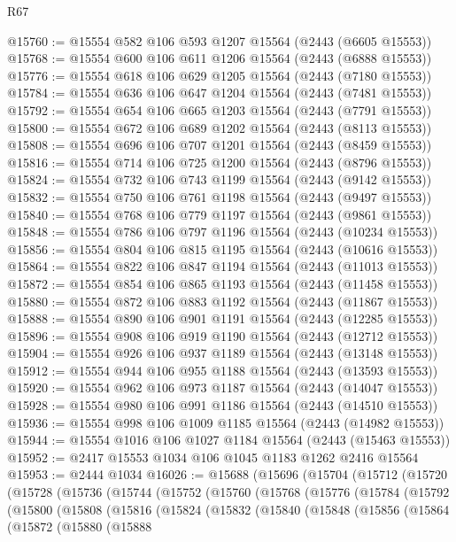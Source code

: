 \begin{lexlean}{R67}
\begin{coremodule}
@15760 := @15554 @582 @106 @593 @1207 @15564 (@2443 (@6605 @15553))
@15768 := @15554 @600 @106 @611 @1206 @15564 (@2443 (@6888 @15553))
@15776 := @15554 @618 @106 @629 @1205 @15564 (@2443 (@7180 @15553))
@15784 := @15554 @636 @106 @647 @1204 @15564 (@2443 (@7481 @15553))
@15792 := @15554 @654 @106 @665 @1203 @15564 (@2443 (@7791 @15553))
@15800 := @15554 @672 @106 @689 @1202 @15564 (@2443 (@8113 @15553))
@15808 := @15554 @696 @106 @707 @1201 @15564 (@2443 (@8459 @15553))
@15816 := @15554 @714 @106 @725 @1200 @15564 (@2443 (@8796 @15553))
@15824 := @15554 @732 @106 @743 @1199 @15564 (@2443 (@9142 @15553))
@15832 := @15554 @750 @106 @761 @1198 @15564 (@2443 (@9497 @15553))
@15840 := @15554 @768 @106 @779 @1197 @15564 (@2443 (@9861 @15553))
@15848 := @15554 @786 @106 @797 @1196 @15564 (@2443 (@10234 @15553))
@15856 := @15554 @804 @106 @815 @1195 @15564 (@2443 (@10616 @15553))
@15864 := @15554 @822 @106 @847 @1194 @15564 (@2443 (@11013 @15553))
@15872 := @15554 @854 @106 @865 @1193 @15564 (@2443 (@11458 @15553))
@15880 := @15554 @872 @106 @883 @1192 @15564 (@2443 (@11867 @15553))
@15888 := @15554 @890 @106 @901 @1191 @15564 (@2443 (@12285 @15553))
@15896 := @15554 @908 @106 @919 @1190 @15564 (@2443 (@12712 @15553))
@15904 := @15554 @926 @106 @937 @1189 @15564 (@2443 (@13148 @15553))
@15912 := @15554 @944 @106 @955 @1188 @15564 (@2443 (@13593 @15553))
@15920 := @15554 @962 @106 @973 @1187 @15564 (@2443 (@14047 @15553))
@15928 := @15554 @980 @106 @991 @1186 @15564 (@2443 (@14510 @15553))
@15936 := @15554 @998 @106 @1009 @1185 @15564 (@2443 (@14982 @15553))
@15944 := @15554 @1016 @106 @1027 @1184 @15564 (@2443 (@15463 @15553))
@15952 := @2417 @15553 @1034 @106 @1045 @1183 @1262 @2416 @15564
@15953 := @2444 @1034
@16026 := @15688
    (@15696
      (@15704
        (@15712
          (@15720
            (@15728
              (@15736
                (@15744
                  (@15752
                    (@15760
                      (@15768
                        (@15776
                          (@15784
                            (@15792
                              (@15800
                                (@15808
                                  (@15816
                                    (@15824
                                      (@15832
                                        (@15840
                                          (@15848
                                            (@15856
                                              (@15864
                                                (@15872
                                                  (@15880
                                                    (@15888

\end{coremodule}
\end{lexlean}
